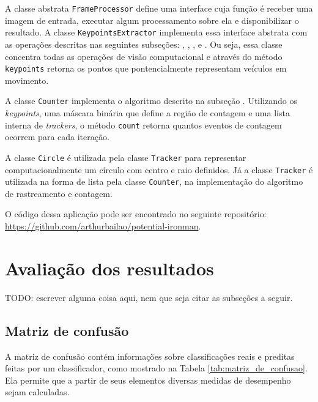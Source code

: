 A classe abstrata \verb!FrameProcessor! define uma interface cuja função é receber uma imagem de entrada, executar algum processamento sobre ela e disponibilizar o resultado. A classe \verb!KeypointsExtractor! implementa essa interface abstrata com as operações descritas nas seguintes subseções: , , ,  e . Ou seja, essa classe concentra todas as operações de visão computacional e através do método \verb!keypoints! retorna os pontos que pontencialmente representam veículos em movimento.

A classe \verb!Counter! implementa o algoritmo descrito na subseção . Utilizando os \textit{keypoints}, uma máscara binária que define a região de contagem e uma lista interna de \textit{trackers}, o método \verb!count! retorna quantos eventos de contagem ocorrem para cada iteração.

A classe \verb!Circle! é utilizada pela classe \verb!Tracker! para representar computacionalmente um círculo com centro e raio definidos. Já a classe \verb!Tracker! é utilizada na forma de lista pela classe \verb!Counter!, na implementação do algoritmo de rastreamento e contagem.

O código dessa aplicação pode ser encontrado no seguinte repositório: \url{https://github.com/arthurbailao/potential-ironman}.


\section{Avaliação dos resultados} %
\label{sec:avalia_o_dos_resultados}

TODO: escrever alguma coisa aqui, nem que seja citar as subseções a seguir.

\subsection{Matriz de confusão} %
\label{sub:matriz_de_confus_o}

A matriz de confusão contém informações sobre classificações reais e preditas feitas por um classificador, como mostrado na Tabela \ref{tab:matriz_de_confusao}. Ela permite que a partir de seus elementos diversas medidas de desempenho sejam calculadas.

